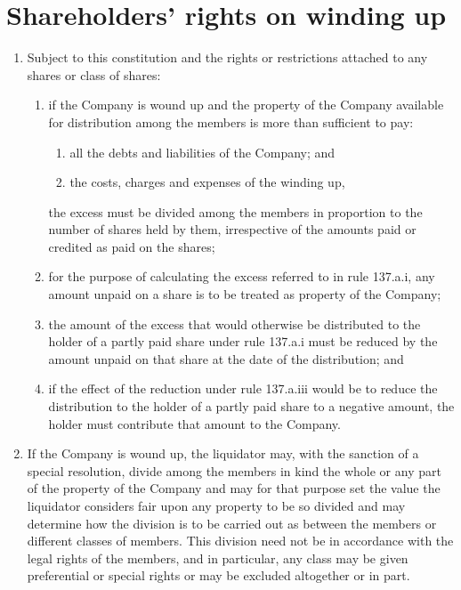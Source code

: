\section{Shareholders' rights on winding up}

\begin{enumerate}[label=(\alph*)]
    \item Subject to this constitution and the rights or restrictions attached to any shares or class of shares:
    \begin{enumerate}[label=(\roman*)]
        \item if the Company is wound up and the property of the Company available for distribution among the members is more than sufficient to pay:
        \begin{enumerate}[label=(\Alph*)]
            \item all the debts and liabilities of the Company; and
            \item the costs, charges and expenses of the winding up,
        \end{enumerate}
        
        the excess must be divided among the members in proportion to the number of shares held by them, irrespective of the amounts paid or credited as paid on the shares;
        
        \item for the purpose of calculating the excess referred to in rule 137.a.i, any amount unpaid on a share is to be treated as property of the Company;
        
        \item the amount of the excess that would otherwise be distributed to the holder of a partly paid share under rule 137.a.i must be reduced by the amount unpaid on that share at the date of the distribution; and
        
        \item if the effect of the reduction under rule 137.a.iii would be to reduce the distribution to the holder of a partly paid share to a negative amount, the holder must contribute that amount to the Company.
    \end{enumerate}
    
    \item If the Company is wound up, the liquidator may, with the sanction of a special resolution, divide among the members in kind the whole or any part of the property of the Company and may for that purpose set the value the liquidator considers fair upon any property to be so divided and may determine how the division is to be carried out as between the members or different classes of members. This division need not be in accordance with the legal rights of the members, and in particular, any class may be given preferential or special rights or may be excluded altogether or in part.
    

\end{enumerate}
